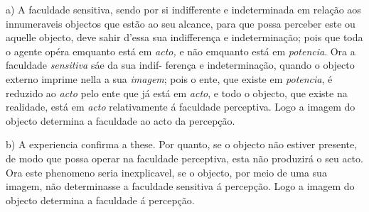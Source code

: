 
 

a) A faculdade sensitiva, sendo por si indifferente e indeterminada em relação aos innumeraveis objectos que estão ao seu alcance, para que possa perceber este ou aquelle objecto, deve sahir d'essa sua indifferença e indeterminação; pois que toda o agente opéra emquanto está em \emph{acto,} e não emquanto está em \emph{potencia}. Ora a faculdade \emph{sensitiva} sáe da sua indif-   ferença e indeterminação, quando o objecto externo imprime nella a sua \emph{imagem}; pois o ente, que existe em \emph{potencia}, é reduzido ao \emph{acto} pelo ente que já está em \emph{acto}, e todo o objecto, que existe na realidade, está em \emph{acto} relativamente á faculdade perceptiva. Logo a imagem do objecto determina a faculdade ao acto da percepção.

b) A experiencia confirma a these. Por quanto, se o objecto não estiver presente, de modo que possa operar na faculdade perceptiva, esta não produzirá o seu acto. Ora este phenomeno   seria inexplicavel, se o objecto, por meio de uma sua imagem, não determinasse a faculdade sensitiva á percepção. Logo a imagem do objecto determina a faculdade á percepção.


